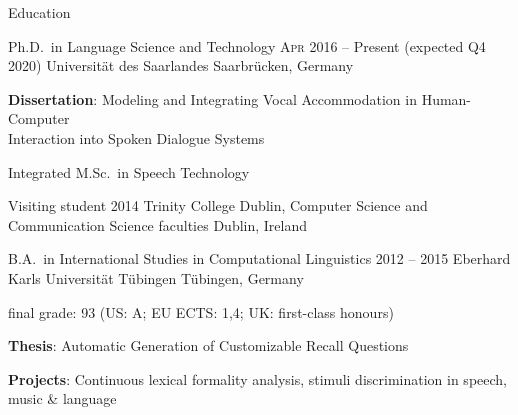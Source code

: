 \documentclass{resume} %
\begin{document}
\begin{rSection}{Education}

\begin{rSubsection}
	{Ph.D.\ in Language Science and Technology}
	{\textsc{Apr} 2016 -- Present (expected Q4 2020)}
	{Universität des Saarlandes}
	{Saarbrücken, Germany} %
	
	\setlength{\itemindent}{.7cm}
		
	\item \textbf{Dissertation}: Modeling and Integrating Vocal Accommodation in Human-Computer  \\\hspace*{3.35cm}Interaction into Spoken Dialogue Systems %
	\item Integrated M.Sc.\ in Speech Technology
\end{rSubsection}

\begin{rSubsection}
	{Visiting student}
	{2014}
	{Trinity College Dublin, Computer Science and Communication Science faculties}
	{Dublin, Ireland}
	
	\setlength{\itemindent}{.7cm}
	
	\item[]
\end{rSubsection}

\begin{rSubsection}
	{B.A.\ in International Studies in Computational Linguistics}
	{2012 -- 2015}
	{Eberhard Karls Universität Tübingen}
	{Tübingen, Germany}
	
	\vspace*{-.2cm}
	\item[]{final grade: 93 {\footnotesize (US: A; EU ECTS: 1,4; UK: first-class honours)}}
	\vspace*{.2cm}

	\setlength{\itemindent}{.7cm}
	
	\item \textbf{Thesis}: Automatic Generation of Customizable Recall Questions
	\item \textbf{Projects}: Continuous lexical formality analysis, stimuli discrimination in speech, music \& language
\end{rSubsection}

\end{rSection}
\end{document}
